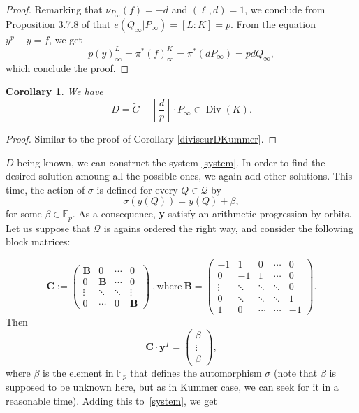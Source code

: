 \documentclass[10pt]{article}
\newtheorem{coro1}[thm]{Corollary}
\theoremstyle{definition}
\theoremstyle{definition}
\theoremstyle{definition}
\newcommand{\cd}{\cdot}
\newcommand{\QR}{\mathcal{Q}}
\newcommand{\Div}{\operatorname{Div}}
\begin{document}
\begin{proof}
Remarking that $\nu_{P_{\infty}}(f) = -d$ and $(\ell,d)=1$, we conclude from Proposition 3.7.8 of \cite{Sti} that $e(Q_{\infty}|P_{\infty})=[L:K]=p$. From the equation $y^p-y=f$, we get 
\[ p(y)^L_{\infty} = \pi^* (f)^K_{\infty} = \pi^* (dP_{\infty}) = pd Q_{\infty},\]
which conclude the proof.
\end{proof}

\begin{coro1} \label{diviseurDArtinSchreier}
We have
\[D = \tilde{G} - \left\lceil\frac{d}{p}\right\rceil \cd P_{\infty} \in \Div(K).\]
\end{coro1}

\begin{proof}
Similar to the proof of Corollary \ref{diviseurDKummer}.
\end{proof}

$D$ being known, we can construct the system \eqref{system}. In order to find the desired solution amoung all the possible ones, we again add other solutions. This time, the action of $\sigma$ is defined for every $Q \in \QR$ by 
\[ \sigma(y(Q)) = y(Q) + \beta,\]
for some $\beta \in \mathbb{F}_p$. As a consequence, \textbf{y} satisfy an arithmetic progression by orbits. Let us suppose that $\QR$ is agains ordered the right way, and consider the following block matrices:

\begin{equation*} 
\mathbf{C} := 
\begin{pmatrix}
\mathbf{B} & 0 & \cdots & 0 \\
0 & \mathbf{B} & \cdots & 0 \\
\vdots & \ddots & \ddots & \vdots \\
0 & \cdots & 0 & \mathbf{B}
\end{pmatrix} \ , \mathrm{where} \ 
\mathbf{B} = 
\begin{pmatrix}
-1 & 1 & 0 & \cdots & 0 \\
0 & -1 & 1 & \cdots & 0 \\
\vdots & \ddots & \ddots & \ddots & 0 \\
0 & \ddots & \ddots & \ddots & 1 \\
1 & 0 & \cdots & \cdots & -1
\end{pmatrix}.
\end{equation*}
Then 
\begin{equation*}
\mathbf{C} \cd \textbf{y}^T
= 
\begin{pmatrix}
\beta \\
\vdots \\
\beta
\end{pmatrix},
\end{equation*}
where $\beta$ is the element in $\mathbb{F}_p$ that defines the automorphism $\sigma$ (note that $\beta$ is supposed to be unknown here, but as in Kummer case, we can seek for it in a reasonable time). Adding this to~\eqref{system}, we get
\end{document}
